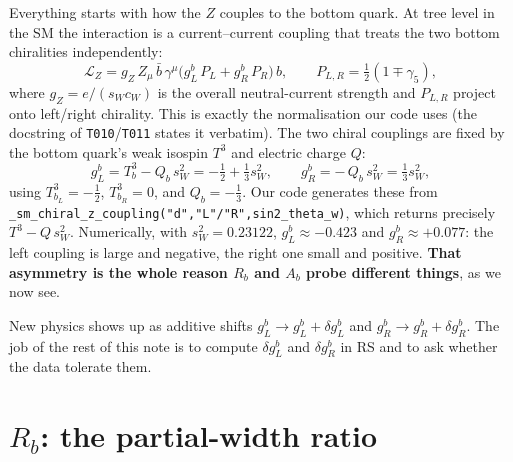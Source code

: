 \documentclass[11pt]{article}
\newcommand{\sw}{s_W}
\newcommand{\cw}{c_W}
\newcommand{\swsq}{s_W^2}
\newcommand{\code}[1]{\texttt{#1}}
\newcommand{\gL}{g_L^b}
\newcommand{\gR}{g_R^b}
\newcommand{\dgL}{\delta g_L^b}
\newcommand{\dgR}{\delta g_R^b}
\theoremstyle{definition}
\begin{document}
Everything starts with how the $Z$ couples to the bottom quark. At tree level in
the SM the interaction is a current--current coupling that treats the two bottom
chiralities independently:
\begin{equation}
\mathcal{L}_Z = g_Z\, Z_\mu\, \bar b\, \gamma^\mu \big(\gL\, P_L + \gR\, P_R\big)\, b,
\qquad P_{L,R} = \tfrac{1}{2}(1\mp\gamma_5),
\label{eq:LZ}
\end{equation}
where $g_Z = e/(\sw\cw)$ is the overall neutral-current strength and
$P_{L,R}$ project onto left/right chirality. This is exactly the normalisation
our code uses (the docstring of \code{T010}/\code{T011} states it verbatim). The
two chiral couplings are fixed by the bottom quark's weak isospin $T^3$ and
electric charge $Q$:
\begin{equation}
\gL = T^3_b - Q_b\,\swsq = -\tfrac{1}{2} + \tfrac{1}{3}\swsq,
\qquad
\gR = -\,Q_b\,\swsq = \tfrac{1}{3}\swsq,
\label{eq:gLgR}
\end{equation}
using $T^3_{b_L} = -\tfrac12$, $T^3_{b_R}=0$, and $Q_b=-\tfrac13$. Our code
generates these from \code{\_sm\_chiral\_z\_coupling("d","L"/"R",sin2\_theta\_w)},
which returns precisely $T^3 - Q\,\swsq$. Numerically, with
$\swsq=0.23122$, $\gL \approx -0.423$ and $\gR \approx +0.077$: the left coupling
is large and negative, the right one small and positive. \textbf{That asymmetry
is the whole reason $R_b$ and $A_b$ probe different things}, as we now see.

New physics shows up as additive shifts $\gL \to \gL + \dgL$ and
$\gR \to \gR + \dgR$. The job of the rest of this note is to compute $\dgL$ and
$\dgR$ in RS and to ask whether the data tolerate them.

\section{$R_b$: the partial-width ratio}
\label{sec:Rb}
\end{document}
